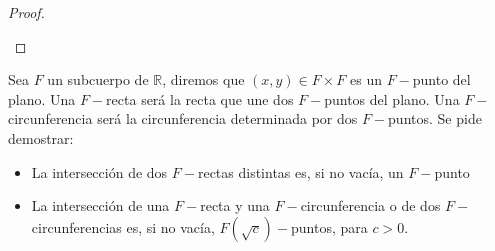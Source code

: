 \begin{lema}
\begin{proof}
        \begin{figure}[H]
            \centering
        \end{figure}
    \end{proof}
\end{lema}

\begin{ejercicio}\label{ej:intersecciones} %
    Sea $F$ un subcuerpo de $\mathbb{R}$, diremos que $(x,y)\in F\times F$ es un $F-$punto del plano. Una $F-$recta será la recta que une dos $F-$puntos del plano. Una $F-$circunferencia será la circunferencia determinada por dos $F-$puntos. Se pide demostrar:
    \begin{itemize}
        \item La intersección de dos $F-$rectas distintas es, si no vacía, un $F-$punto
        \item La intersección de una $F-$recta y una $F-$circunferencia o de dos $F-$circunferencias es, si no vacía, $F(\sqrt{c})-$puntos, para $c>0$.
    \end{itemize}
\end{ejercicio}

